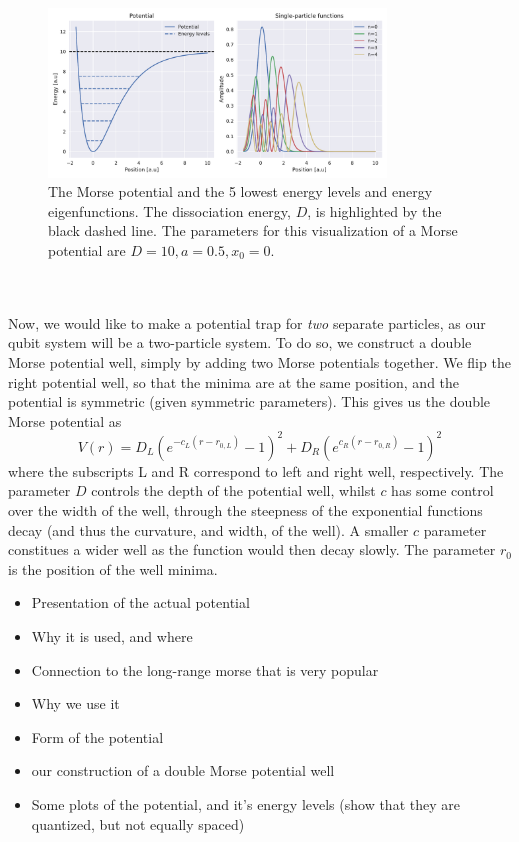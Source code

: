 \documentclass{subfiles}
\begin{document}
\begin{figure}
    \centering
    \includegraphics[width=0.8\textwidth]{figs/potential_spf.pdf}
    \caption{The Morse potential and the 5 lowest energy levels and energy eigenfunctions. The dissociation energy, $D$, is highlighted by the black dashed line. The parameters for this visualization of a Morse potential are $D=10, a=0.5, x_0=0$.}
    \label{fig:morse_potential}
\end{figure}


\\ \\
Now, we would like to make a potential trap for \emph{two} separate particles, as our qubit system will be a two-particle system. To do so, we construct a double Morse potential well, simply by adding two Morse potentials together. We flip the right potential well, so that the minima are at the same position, and the potential is symmetric (given symmetric parameters). This gives us the double Morse potential as
\begin{equation}
    V(r) = D_L(e^{-c_L(r-r_{0,L})} - 1)^2 + D_R(e^{c_R(r-r_{0,R})} - 1)^2
\end{equation}
where the subscripts L and R correspond to left and right well, respectively. The parameter $D$ controls the depth of the potential well, whilst $c$ has some control over the width of the well, through the steepness of the exponential functions decay (and thus the curvature, and width, of the well). A smaller $c$ parameter constitues a wider well as the function would then decay slowly. The parameter $r_0$ is the position of the well minima. 

\begin{itemize}
    \item Presentation of the actual potential
    \item Why it is used, and where
    \item Connection to the long-range morse that is very popular
    \item Why we use it
    \item Form of the potential
    \item our construction of a double Morse potential well
    \item Some plots of the potential, and it's energy levels (show that they are quantized, but not equally spaced)
\end{itemize}
\end{document}
